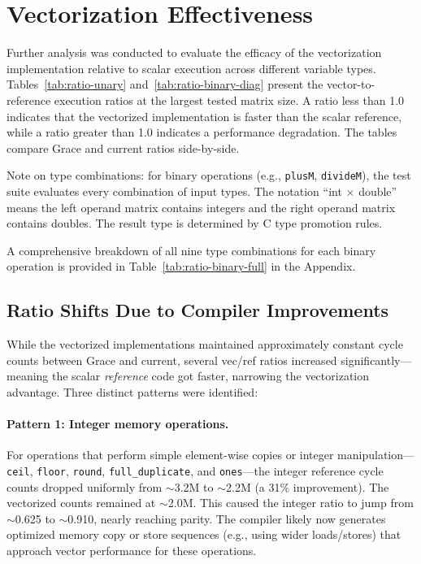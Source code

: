 \section{Vectorization Effectiveness}

Further analysis was conducted to evaluate the efficacy of the vectorization implementation relative to scalar execution across different variable types. Tables~\ref{tab:ratio-unary} and~\ref{tab:ratio-binary-diag} present the vector-to-reference execution ratios at the largest tested matrix size. A ratio less than 1.0 indicates that the vectorized implementation is faster than the scalar reference, while a ratio greater than 1.0 indicates a performance degradation. The tables compare Grace and current ratios side-by-side.

Note on type combinations: for binary operations (e.g., \texttt{plusM}, \texttt{divideM}), the test suite evaluates every combination of input types. The notation ``int $\times$ double'' means the left operand matrix contains integers and the right operand matrix contains doubles. The result type is determined by C type promotion rules.





A comprehensive breakdown of all nine type combinations for each binary operation is provided in Table~\ref{tab:ratio-binary-full} in the Appendix.

\subsection{Ratio Shifts Due to Compiler Improvements}

While the vectorized implementations maintained approximately constant cycle counts between Grace and current, several vec/ref ratios increased significantly---meaning the scalar \emph{reference} code got faster, narrowing the vectorization advantage. Three distinct patterns were identified:

\paragraph{Pattern 1: Integer memory operations.} For operations that perform simple element-wise copies or integer manipulation---\texttt{ceil}, \texttt{floor}, \texttt{round}, \texttt{full\_duplicate}, and \texttt{ones}---the integer reference cycle counts dropped uniformly from $\sim$3.2M to $\sim$2.2M (a 31\% improvement). The vectorized counts remained at $\sim$2.0M. This caused the integer ratio to jump from $\sim$0.625 to $\sim$0.910, nearly reaching parity. The compiler likely now generates optimized memory copy or store sequences (e.g., using wider loads/stores) that approach vector performance for these operations.

